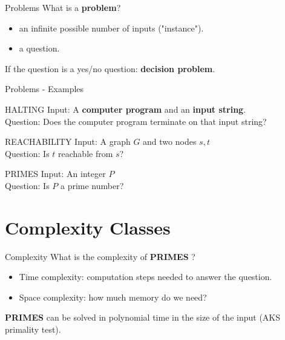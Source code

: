 \documentclass[c]{beamer}
\begin{document}
\begin{frame}{Problems}
        What is a \textbf{problem}?
         \begin{itemize}
			\item an infinite possible number of inputs ("instance").
			\item a question.
		\end{itemize}	 
		
		If the question is a yes/no question: \textbf{decision problem}. 		
	
\end{frame}

\begin{frame}{Problems - Examples}
    \begin{block}{ HALTING }
		Input: A \textbf{computer program} and an \textbf{input string}.\\
		Question: Does the computer program terminate on that input string?
    \end{block}	
	
	\begin{block}{ REACHABILITY }
		Input: A graph $G$ and two nodes $s,t$\\
		Question: Is $t$ reachable from $s$?
    \end{block}	
    
    \begin{block}{ PRIMES }
		Input: An integer $P$\\
		Question: Is $P$ a prime number?
    \end{block}	
    
\end{frame}

\section{Complexity Classes}
\begin{frame}{Complexity}
      What is the complexity of \textbf{PRIMES} ?
	 \begin{itemize}
			\item Time complexity: computation steps needed to answer the question.
			\item Space complexity: how much memory do we need?
	 \end{itemize}
	 
	 \textbf{PRIMES} can be solved in polynomial time in the size of the input (AKS primality test).
	 
\end{frame}
\end{document}
